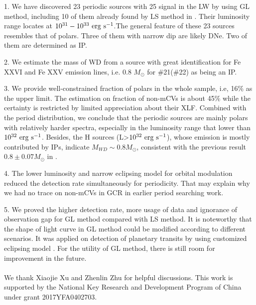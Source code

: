 \documentclass[fleqn,usenatbib]{mnras}
\begin{document}
1. We have discovered 23 periodic sources with 25 signal in the LW by using GL method, including 10 of them already found by LS method in \cite{2012ApJ...746..165H}. Their luminosity range locates at $\rm 10^{31}-10^{33}~erg~s^{-1} $.The general feature of these 23 sources resembles that of polars. Three of them with narrow dip are likely DNe. Two of them are determined as IP.

2.  We estimate the mass of WD from a source with great identification for Fe XXVI and Fe XXV emission lines, i.e. 0.8 $M_\odot$ for \#21(\#22) as being an IP. 

3. We provide well-constrained fraction of polars in the whole sample, i.e, 16\% as the upper limit. The estimation on fraction of non-mCVs is about 45\% while the certainty is restricted by limited appreciation about their XLF. Combined with the period distribution, we conclude that the periodic sources are mainly polars with relatively harder spectra, especially in the luminosity range that lower than $\rm 10^{32}~erg~s^{-1}$. Besides, the H sources (L>$\rm 10^{32}~erg~s^{-1}$), whose emission is mostly contributed by IPs, indicate  $M_{WD} \sim 0.8 M_\odot$, consistent with the previous result $0.8\pm 0.07 M_\odot$ in \citep{2018ApJ...853..182Y}.

4. The lower luminosity and narrow eclipsing model for orbital modulation reduced the detection rate simultaneously for periodicity. That may explain why we had no trace on non-mCVs in GCR in earlier period searching work.

5. We proved the higher detection rate, more usage of data and ignorance of observation gap for GL method compared with LS method. It is noteworthy that the shape of light curve in GL method could be modified according to different scenarios. It was applied on detection of planetary transits by using customized eclipsing model \citep{2002A&A...395..625A}. For the utility of GL method, there is still room for improvement in the future.
\\
\\

We thank Xiaojie Xu and Zhenlin Zhu for helpful discussions. This work is supported by the National Key Research and Development Program of China under grant 2017YFA0402703.

\end{document}
